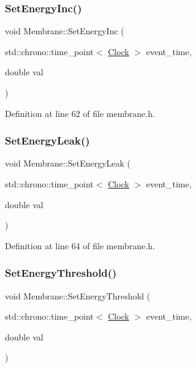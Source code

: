 \subsubsection{\texorpdfstring{Set\+Energy\+Inc()}{SetEnergyInc()}}
{\footnotesize\ttfamily void Membrane\+::\+Set\+Energy\+Inc (\begin{DoxyParamCaption}\item[{std\+::chrono\+::time\+\_\+point$<$ \hyperlink{universe_8h_a0ef8d951d1ca5ab3cfaf7ab4c7a6fd80}{Clock} $>$}]{event\+\_\+time,  }\item[{double}]{val }\end{DoxyParamCaption})\hspace{0.3cm}{\ttfamily [inline]}}



Definition at line 62 of file membrane.\+h.

\mbox{\label{class_membrane_a96618ef2c05a8af5d6bd8606c9b8eae8}} 
\subsubsection{\texorpdfstring{Set\+Energy\+Leak()}{SetEnergyLeak()}}
{\footnotesize\ttfamily void Membrane\+::\+Set\+Energy\+Leak (\begin{DoxyParamCaption}\item[{std\+::chrono\+::time\+\_\+point$<$ \hyperlink{universe_8h_a0ef8d951d1ca5ab3cfaf7ab4c7a6fd80}{Clock} $>$}]{event\+\_\+time,  }\item[{double}]{val }\end{DoxyParamCaption})\hspace{0.3cm}{\ttfamily [inline]}}



Definition at line 64 of file membrane.\+h.

\mbox{\label{class_membrane_a6d0b96fb6d823cc113dd56b8889b1544}} 
\subsubsection{\texorpdfstring{Set\+Energy\+Threshold()}{SetEnergyThreshold()}}
{\footnotesize\ttfamily void Membrane\+::\+Set\+Energy\+Threshold (\begin{DoxyParamCaption}\item[{std\+::chrono\+::time\+\_\+point$<$ \hyperlink{universe_8h_a0ef8d951d1ca5ab3cfaf7ab4c7a6fd80}{Clock} $>$}]{event\+\_\+time,  }\item[{double}]{val }\end{DoxyParamCaption})\hspace{0.3cm}{\ttfamily [inline]}}



